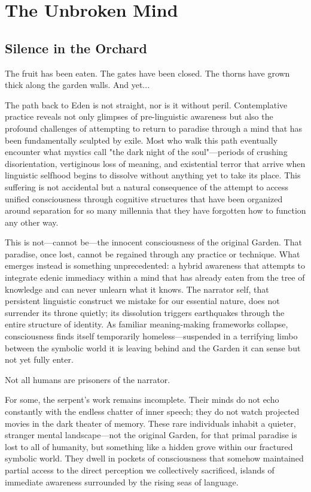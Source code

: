 \chapter{The Unbroken Mind}

\section{Silence in the Orchard}

The fruit has been eaten.
The gates have been closed.
The thorns have grown thick along the garden walls.
And yet...

The path back to Eden is not straight, nor is it without peril. Contemplative practice reveals not only glimpses of pre-linguistic awareness but also the profound challenges of attempting to return to paradise through a mind that has been fundamentally sculpted by exile. Most who walk this path eventually encounter what mystics call "the dark night of the soul"—periods of crushing disorientation, vertiginous loss of meaning, and existential terror that arrive when linguistic selfhood begins to dissolve without anything yet to take its place. This suffering is not accidental but a natural consequence of the attempt to access unified consciousness through cognitive structures that have been organized around separation for so many millennia that they have forgotten how to function any other way.

This is not—cannot be—the innocent consciousness of the original Garden. That paradise, once lost, cannot be regained through any practice or technique. What emerges instead is something unprecedented: a hybrid awareness that attempts to integrate edenic immediacy within a mind that has already eaten from the tree of knowledge and can never unlearn what it knows. The narrator self, that persistent linguistic construct we mistake for our essential nature, does not surrender its throne quietly; its dissolution triggers earthquakes through the entire structure of identity. As familiar meaning-making frameworks collapse, consciousness finds itself temporarily homeless—suspended in a terrifying limbo between the symbolic world it is leaving behind and the Garden it can sense but not yet fully enter.

Not all humans are prisoners of the narrator. 

For some, the serpent's work remains incomplete. Their minds do not echo constantly with the endless chatter of inner speech; they do not watch projected movies in the dark theater of memory. These rare individuals inhabit a quieter, stranger mental landscape—not the original Garden, for that primal paradise is lost to all of humanity, but something like a hidden grove within our fractured symbolic world. They dwell in pockets of consciousness that somehow maintained partial access to the direct perception we collectively sacrificed, islands of immediate awareness surrounded by the rising seas of language.

